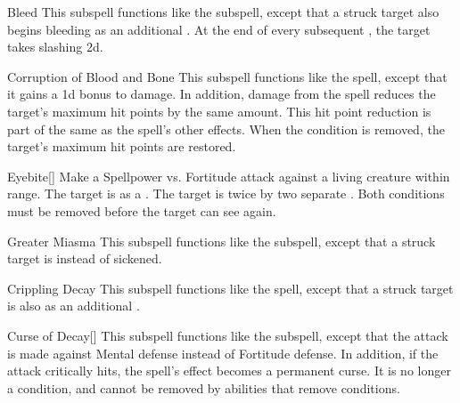 \begin{ability}[\nth{4}]{Bleed}
This subspell functions like the  subspell, except that a struck target also begins bleeding as an additional .
At the end of every subsequent , the target takes slashing  \minus2d.
\end{ability}
\vspace{0.25em}


\begin{ability}[\nth{4}]{Corruption of Blood and Bone}
This subspell functions like the  spell, except that it gains a \plus1d bonus to damage.
In addition, damage from the spell reduces the target's maximum hit points by the same amount.
This hit point reduction is part of the same  as the spell's other effects.
When the condition is removed, the target's maximum hit points are restored.
\end{ability}
\vspace{0.25em}


\begin{ability}[\nth{4}]{Eyebite}[]
Make a Spellpower vs. Fortitude attack against a living creature within \rngclose range.
\hit The target is  as a .
\crit The target is  twice by two separate .
Both conditions must be removed before the target can see again.
\end{ability}
\vspace{0.25em}


\begin{ability}[\nth{4}]{Greater Miasma}
This subspell functions like the  subspell, except that a struck target is  instead of sickened.
\end{ability}
\vspace{0.25em}


\begin{ability}[\nth{5}]{Crippling Decay}
This subspell functions like the  spell, except that a struck target is also  as an additional .
\end{ability}
\vspace{0.25em}


\begin{ability}[\nth{6}]{Curse of Decay}[]
This subspell functions like the  subspell, except that the attack is made against Mental defense instead of Fortitude defense.
In addition, if the attack critically hits, the spell's effect becomes a permanent curse.
It is no longer a condition, and cannot be removed by abilities that remove conditions.
\end{ability}
\vspace{0.25em}


